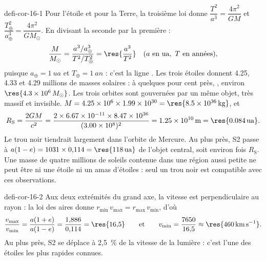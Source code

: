 \begin{blocEdition}{defi-cor-16-1}
Pour l'étoile et pour la Terre, la troisième loi donne $\dfrac{T^2}{a^3}=\dfrac{4\pi^2}{GM}$ et $\dfrac{T_\oplus^2}{a_\oplus^3}=\dfrac{4\pi^2}{GM_\odot}$.
En divisant la seconde par la première :
\[\frac{M}{M_\odot}=\frac{a^3/a_\oplus^3}{T^2/T_\oplus^2}=\res{\frac{a^3}{T^2}}\quad(a\text{ en ua},\ T\text{ en années}),\]
puisque $a_\oplus=\qty{1}{ua}$ et $T_\oplus=\qty{1}{an}$ : c'est la ligne .
Les trois étoiles donnent \num{4.25}, \num{4.33} et \num{4.29} millions de masses solaires : à quelques pour cent près,
, environ $\res{\num{4.3e6}\,M_\odot}$. Les trois orbites sont gouvernées par un même objet, très massif
et invisible.
$M=\num{4.25e6}\times\num{1.99e30}=\res{\qty{8,5e36}{kg}}$, et
\[R_\mathrm{S}=\frac{2GM}{c^2}=\frac{2\times\num{6.67e-11}\times\num{8.47e36}}{(\num{3.00e8})^2}=\qty{1,25e10}{m}=\res{\qty{0,084}{ua}}.\]
Le trou noir tiendrait largement dans l'orbite de Mercure.
Au plus près, S2 passe à $a(1-e)=1031\times0{,}114=\res{\qty{118}{ua}}$ de l'objet central, soit environ  fois
$R_\mathrm{S}$. Une masse de quatre millions de soleils contenue dans une région aussi petite ne peut être ni une étoile ni
un amas d'étoiles : seul un trou noir est compatible avec ces observations.
\end{blocEdition}

\begin{blocEdition}{defi-cor-16-2}
\label{figedition-defi-cor-16-2-1}
Aux deux extrémités du grand axe, la vitesse est perpendiculaire au rayon : la loi des aires donne
$r_\text{min}\,v_\text{max}=r_\text{max}\,v_\text{min}$, d'où
\[\frac{v_\text{max}}{v_\text{min}}=\frac{a(1+e)}{a(1-e)}=\frac{1{,}886}{0{,}114}=\res{16{,}5}\qquad\text{et}\qquad
v_\text{min}=\frac{7650}{16{,}5}\approx\res{\qty{460}{km.s^{-1}}}.\]
Au plus près, S2 se déplace à 2,5~\% de la vitesse de la lumière : c'est l'une des étoiles les plus rapides connues.
\end{blocEdition}

